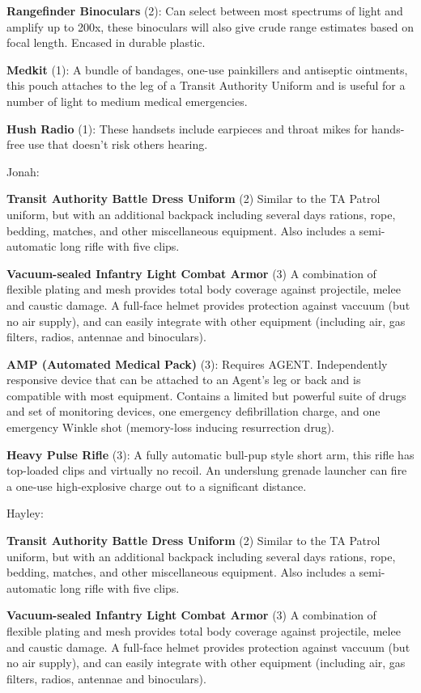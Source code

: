 \textbf{Rangefinder Binoculars} (2): Can select between most spectrums of light and amplify up to 200x, these binoculars will also give crude range estimates based on focal length. Encased in durable plastic.

\textbf{Medkit} (1): A bundle of bandages, one-use painkillers and antiseptic ointments, this pouch attaches to the leg of a Transit Authority Uniform and is useful for a number of light to medium medical emergencies.

\textbf{Hush Radio} (1): These handsets include earpieces and throat mikes for hands-free use that doesn't risk others hearing.



Jonah:

\textbf{Transit Authority Battle Dress Uniform} (2) Similar to the TA Patrol uniform, but with an additional backpack including several days rations, rope, bedding, matches, and other miscellaneous equipment. Also includes a semi-automatic long rifle with five clips.

\textbf{Vacuum-sealed Infantry Light Combat Armor} (3) A combination of flexible plating and mesh provides total body coverage against projectile, melee and caustic damage. A full-face helmet provides protection against vaccuum (but no air supply), and can easily integrate with other equipment (including air, gas filters, radios, antennae and binoculars).

\textbf{AMP (Automated Medical Pack)} (3): Requires AGENT. Independently responsive device that can be attached to an Agent's leg or back and is compatible with most equipment. Contains a limited but powerful suite of drugs and set of monitoring devices, one emergency defibrillation charge, and one emergency Winkle shot (memory-loss inducing resurrection drug).

\textbf{Heavy Pulse Rifle }(3): A fully automatic bull-pup style short arm, this rifle has top-loaded clips and virtually no recoil. An underslung grenade launcher can fire a one-use high-explosive charge out to a significant distance.



Hayley:

\textbf{Transit Authority Battle Dress Uniform} (2) Similar to the TA Patrol uniform, but with an additional backpack including several days rations, rope, bedding, matches, and other miscellaneous equipment. Also includes a semi-automatic long rifle with five clips.

\textbf{Vacuum-sealed Infantry Light Combat Armor} (3) A combination of flexible plating and mesh provides total body coverage against projectile, melee and caustic damage. A full-face helmet provides protection against vaccuum (but no air supply), and can easily integrate with other equipment (including air, gas filters, radios, antennae and binoculars).

